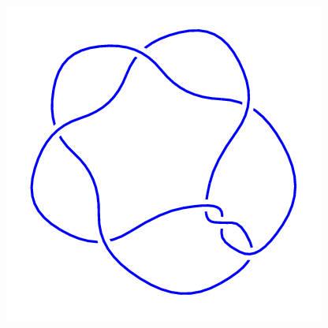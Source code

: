 \begin{figure}[H]
\begin{minipage}[b]{.18\linewidth}
    \end{minipage}
    \begin{minipage}[b]{.18\linewidth}
        \centering
        \includegraphics[width=\linewidth]{../data/7_3.png}
    \end{minipage}
\end{figure}
